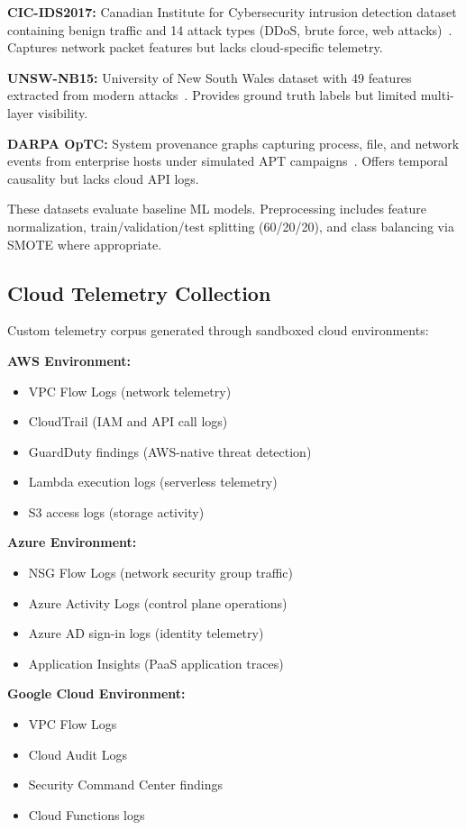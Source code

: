 \textbf{CIC-IDS2017:} Canadian Institute for Cybersecurity intrusion detection dataset containing benign traffic and 14 attack types (DDoS, brute force, web attacks)~\cite{sharafaldin2018cicids}. Captures network packet features but lacks cloud-specific telemetry.

\textbf{UNSW-NB15:} University of New South Wales dataset with 49 features extracted from modern attacks~\cite{moustafa2015unswvnb15}. Provides ground truth labels but limited multi-layer visibility.

\textbf{DARPA OpTC:} System provenance graphs capturing process, file, and network events from enterprise hosts under simulated APT campaigns~\cite{darpaoptc2020}. Offers temporal causality but lacks cloud API logs.

These datasets evaluate baseline ML models. Preprocessing includes feature normalization, train/validation/test splitting (60/20/20), and class balancing via SMOTE where appropriate.

\subsection{Cloud Telemetry Collection}
Custom telemetry corpus generated through sandboxed cloud environments:

\textbf{AWS Environment:}
\begin{itemize}
    \item VPC Flow Logs (network telemetry)
    \item CloudTrail (IAM and API call logs)
    \item GuardDuty findings (AWS-native threat detection)
    \item Lambda execution logs (serverless telemetry)
    \item S3 access logs (storage activity)
\end{itemize}

\textbf{Azure Environment:}
\begin{itemize}
    \item NSG Flow Logs (network security group traffic)
    \item Azure Activity Logs (control plane operations)
    \item Azure AD sign-in logs (identity telemetry)
    \item Application Insights (PaaS application traces)
\end{itemize}

\textbf{Google Cloud Environment:}
\begin{itemize}
    \item VPC Flow Logs
    \item Cloud Audit Logs
    \item Security Command Center findings
    \item Cloud Functions logs
\end{itemize}

